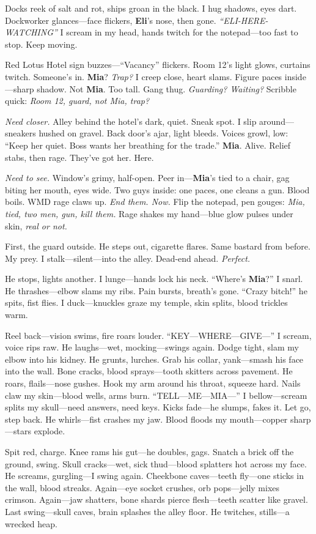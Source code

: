 \documentclass{article}
\begin{document}
Docks reek of salt and rot, ships groan in the black. I hug shadows, eyes dart. Dockworker glances—face flickers, \textbf{Eli}’s nose, then gone. \textit{“ELI-HERE-WATCHING”} I scream in my head, hands twitch for the notepad—too fast to stop. Keep moving.

Red Lotus Hotel sign buzzes—“Vacancy” flickers. Room 12’s light glows, curtains twitch. Someone’s in. \textbf{Mia}? \textit{Trap?} I creep close, heart slams. Figure paces inside—sharp shadow. Not \textbf{Mia}. Too tall. Gang thug. \textit{Guarding? Waiting?} Scribble quick: \textit{Room 12, guard, not Mia, trap?}

\textit{Need closer.} Alley behind the hotel’s dark, quiet. Sneak spot. I slip around—sneakers hushed on gravel. Back door’s ajar, light bleeds. Voices growl, low: “Keep her quiet. Boss wants her breathing for the trade.” \textbf{Mia}. Alive. Relief stabs, then rage. They’ve got her. Here.

\textit{Need to see.} Window’s grimy, half-open. Peer in—\textbf{Mia}’s tied to a chair, gag biting her mouth, eyes wide. Two guys inside: one paces, one cleans a gun. Blood boils. WMD rage claws up. \textit{End them. Now.} Flip the notepad, pen gouges: \textit{Mia, tied, two men, gun, kill them.} Rage shakes my hand—blue glow pulses under skin, \textit{real or not.}

First, the guard outside. He steps out, cigarette flares. Same bastard from before. My prey. I stalk—silent—into the alley. Dead-end ahead. \textit{Perfect.}

He stops, lights another. I lunge—hands lock his neck. “Where’s \textbf{Mia}?” I snarl. He thrashes—elbow slams my ribs. Pain bursts, breath’s gone. “Crazy bitch!” he spits, fist flies. I duck—knuckles graze my temple, skin splits, blood trickles warm.

Reel back—vision swims, fire roars louder. “KEY—WHERE—GIVE—” I scream, voice rips raw. He laughs—wet, mocking—swings again. Dodge tight, slam my elbow into his kidney. He grunts, lurches. Grab his collar, yank—smash his face into the wall. Bone cracks, blood sprays—tooth skitters across pavement. He roars, flails—nose gushes. Hook my arm around his throat, squeeze hard. Nails claw my skin—blood wells, arms burn. “TELL—ME—MIA—” I bellow—scream splits my skull—need answers, need keys. Kicks fade—he slumps, fakes it. Let go, step back. He whirls—fist crashes my jaw. Blood floods my mouth—copper sharp—stars explode.

Spit red, charge. Knee rams his gut—he doubles, gags. Snatch a brick off the ground, swing. Skull cracks—wet, sick thud—blood splatters hot across my face. He screams, gurgling—I swing again. Cheekbone caves—teeth fly—one sticks in the wall, blood streaks. Again—eye socket crushes, orb pops—jelly mixes crimson. Again—jaw shatters, bone shards pierce flesh—teeth scatter like gravel. Last swing—skull caves, brain splashes the alley floor. He twitches, stills—a wrecked heap.
\end{document}
